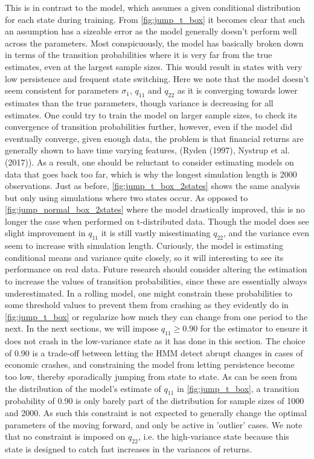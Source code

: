 This is in contrast to the \mle model, which assumes a given conditional distribution for each state during training. From \cref{fig:jump_t_box} it becomes clear that such an assumption has a sizeable error as the model generally doesn't perform well across the parameters. Most conspicuously, the \mle model has basically broken down in terms of the transition probabilities where it is very far from the true estimates, even at the largest sample sizes. This would result in states with very low persistence and frequent state switching. Here we note that the \mle model doesn't seem consistent for parameters $\sigma_1$, $q_{11}$ and $q_{22}$ as it is converging towards lower estimates than the true parameters, though variance is decreasing for all estimates. One could try to train the \mle model on larger sample sizes, to check its convergence of transition probabilities further, however, even if the model did eventually converge, given enough data, the problem is that financial returns are generally shown to have time varying features, (Ryden (1997), Nystrup et al. (2017)). As a result, one should be reluctant to consider estimating models on data that goes back too far, which is why the longest simulation length is 2000 observations. Just as before, \cref{fig:jump_t_box_2states} shows the same analysis but only using simulations where two states occur. As opposed to \cref{fig:jump_normal_box_2states} where the \mle model drastically improved, this is no longer the case when performed on t-distributed data. Though the \mle model does see slight improvement in $q_{11}$ it is still vastly misestimating $q_{22}$, and the variance even seem to increase with simulation length. Curiously, the \mle model is estimating conditional means and variance quite closely, so it will interesting to see its performance on real data. Future research should consider altering the \mle estimation to increase the values of transition probabilities, since these are essentially always underestimated. In a rolling model, one might constrain these probabilities to some threshold values to prevent them from crashing as they evidently do in \cref{fig:jump_t_box} or regularize how much they can change from one period to the next. In the next sections, we will impose $q_{11} \geq 0.90$ for the \mle estimator to ensure it does not crash in the low-variance state as it has done in this section. The choice of 0.90 is a trade-off between letting the HMM detect abrupt changes in cases of economic crashes, and constraining the model from letting persistence become too low, thereby sporadically jumping from state to state. As can be seen from the distribution of the \mle model's estimate of $q_{11}$ in \cref{fig:jump_t_box}, a transition probability of 0.90 is only barely part of the distribution for sample sizes of 1000 and 2000. As such this constraint is not expected to generally change the optimal parameters of the \mle moving forward, and only be active in 'outlier' cases. We note that no constraint is imposed on $q_{22}$, i.e. the high-variance state because this state is designed to catch fast increases in the variances of returns.

